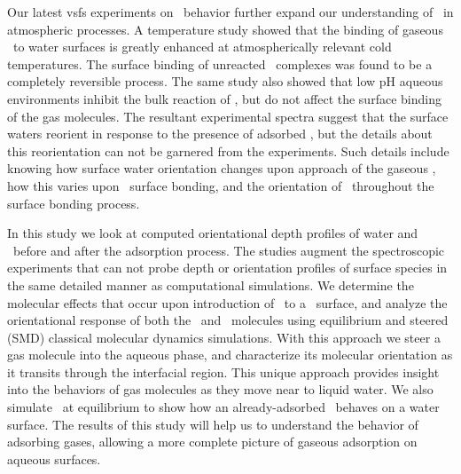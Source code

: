 Our latest vsfs experiments on \suldiox~behavior further expand our understanding of \suldiox~in atmospheric processes.\cite{Ota2011} A temperature study showed that the binding of gaseous \suldiox~to water surfaces is greatly enhanced at atmospherically relevant cold temperatures. The surface binding of unreacted \suldiox~complexes was found to be a completely reversible process. The same study also showed that low pH aqueous environments inhibit the bulk reaction of \suldiox, but do not affect the surface binding of the gas molecules. The resultant experimental spectra suggest that the surface waters reorient in response to the presence of adsorbed \suldiox, but the details about this reorientation can not be garnered from the experiments.  Such details include knowing how surface water orientation changes upon approach of the gaseous \suldiox, how this varies upon \suldiox~surface bonding, and the orientation of \suldiox~throughout the surface bonding process. 

In this study we look at computed orientational depth profiles of water and \suldiox~before and after the adsorption process. The studies augment the spectroscopic experiments that can not probe depth or orientation profiles of surface species in the same detailed manner as computational simulations. We determine the molecular effects that occur upon introduction of \suldiox~to a \wat~surface, and analyze the orientational response of both the \suldiox~and \wat~molecules using equilibrium and steered (SMD) classical molecular dynamics simulations. With this approach we steer a gas molecule into the aqueous phase, and characterize its molecular orientation as it transits through the interfacial region.  This unique approach provides insight into the behaviors of gas molecules as they move near to liquid water. We also simulate \suldiox~at equilibrium to show how an already-adsorbed \suldiox~behaves on a water surface. The results of this study will help us to understand the behavior of adsorbing gases, allowing a more complete picture of gaseous adsorption on aqueous surfaces.
